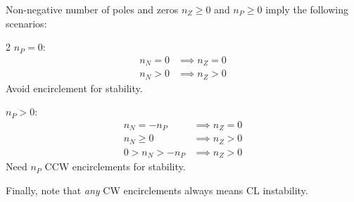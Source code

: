 \documentclass[10pt]{beamer-control}
\begin{document}
\begin{frame}{Non-negative number of poles and zeros}
$n_Z\ge 0$ and $n_P\ge 0$ imply the following scenarios:
\begin{multicols}{2}
$n_P=0$:
\begin{align*}
n_N=0 &\implies n_Z=0 \\
n_N>0 &\implies n_Z>0
\end{align*}
Avoid encirclement for stability.
\bigskip

$n_P>0$:
\begin{align*}
n_N=-n_P &\implies n_Z=0 \\
n_N\ge 0 &\implies n_Z>0 \\
0>n_N>-n_P &\implies n_Z>0
\end{align*}
Need $n_P$ CCW encirclements for stability.
\end{multicols}

Finally, note that \emph{any} CW encirclements always means CL instability.
\end{frame}



\SUMMARYFRAME
\FINALE
\end{document}
